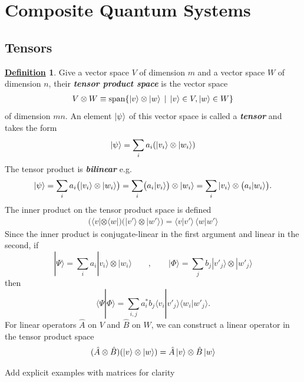 \documentclass[11pt, answers]{exam}
\theoremstyle{definition}
\newtheorem{definition}{\underline{Definition}}[section]
\theoremstyle{bulleted}
\begin{document}
	\section{Composite Quantum Systems}
	\subsection{Tensors}
	\begin{definition}
		Give a vector space $V$ of dimension $m$ and a vector space $W$ of dimension $n$, their \textit{\textbf{tensor product space}} is the vector space
		\begin{align*}
			V\otimes W \equiv \operatorname{span}\{\ket{v}\otimes\ket{w} \, \mid \, \ket{v}\in V, \ket{w}\in W\}
		\end{align*}
		of dimension $mn$. An element $\ket{\psi}$ of this vector space is called a \textit{\textbf{tensor}} and takes the form
		\begin{align*}
			\ket{\psi} = \sum_{i} a_i (\ket{v_i}\otimes\ket{w_i})
		\end{align*}
		The tensor product is \textit{\textbf{bilinear}} e.g.
		\[
		\ket{\psi} = \sum_i
		a_i\bigl(|v_i\rangle\otimes|w_i\rangle\bigr)
		=
		\sum_i
		\bigl(a_i|v_i\rangle\bigr)\otimes|w_i\rangle
		=
		\sum_i
		|v_i\rangle\otimes\bigl(a_i|w_i\rangle\bigr).
		\]
		The inner product on the tensor product space is defined
		\begin{align*}
			\bigl(\langle v|\otimes\langle w|\bigr)
			\bigl(|v'\rangle\otimes|w'\rangle\bigr)
			=\langle v|v'\rangle\,\langle w|w'\rangle
		\end{align*}
		Since the inner product is conjugate-linear in the first argument and linear in the second, if
		\[
		|\Psi\rangle=\sum_i a_i|v_i\rangle\otimes|w_i\rangle\qquad,
		\qquad
		|\Phi\rangle=\sum_j b_j|v'_j\rangle\otimes|w'_j\rangle
		\]
		then
		\[
		{
			\langle\Psi|\Phi\rangle
			=\sum_{i,j}a_i^*b_j
			\langle v_i|v'_j\rangle
			\langle w_i|w'_j\rangle.
		}
		\]
		For linear operators $\hat{A}$ on $V$ and $\hat{B}$ on $W$, we can construct a linear operator in the tensor product space
		\begin{align*}
			(\hat{A}\otimes\hat{B})(\ket{v}\otimes\ket{w}) = \hat{A}\ket{v}\otimes \hat{B}\ket{w}
		\end{align*}
	\end{definition}
	\begin{todo}
		Add explicit examples with matrices for clarity
	\end{todo}
	
\end{document}

